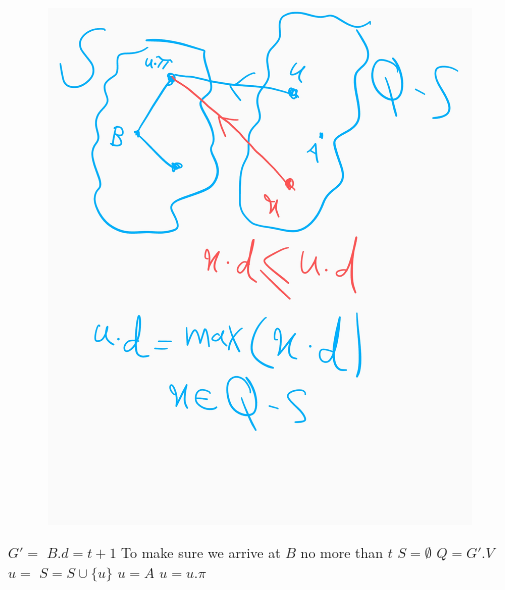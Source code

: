\documentclass{book}
\begin{document}
\begin{enumerate}
\begin{enumerate}
\begin{itemize}
\begin{figure}
			\includegraphics[width=\linewidth]{images/latest-departure.jpg}
			\end{figure}
			\begin{algorithm}[h!]
				\begin{algorithmic}[1]			
						\State $G' = $ 
						\State {}
						\State $B.d = t + 1$ \Comment To make sure we arrive at $B$ no more than $t$
						\State $S = \emptyset$
						\State $Q = G'.V$
							\State $u = $ 
							\State $S = S \cup \{u\}$
								\State {}
							\EndFor
						\EndWhile
							\State $u = A$
								\State \Call{PRINT}{$u, u.\pi$}
								\State $u = u.\pi$
							\EndWhile
						\Else
							\State {}
						\EndIf
					\EndFunction
				\end{algorithmic}
			\end{algorithm}
			\begin{algorithm}[h!]

\end{algorithm}
\end{itemize}
\end{enumerate}
\end{enumerate}
\end{document}

